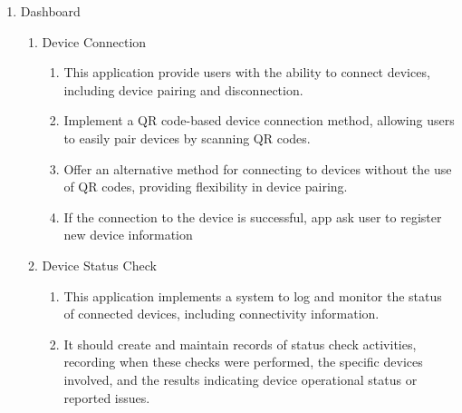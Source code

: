 \begin{enumerate}[label=\arabic*.]
      \item {\large{Dashboard}}\\
            \begin{enumerate}[label*={\arabic*.}]
                  \item {\large{Device Connection}}\\
                        \begin{enumerate}[label*={\arabic*.},ref=\theenumi.\arabic*]
                              \setlength{\itemindent}{0.5cm}
                              \item This application provide users with the ability to connect devices, including device pairing and disconnection.\\
                              \item Implement a QR code-based device connection method, allowing users to easily pair devices by scanning QR codes.\\
                              \item Offer an alternative method for connecting to devices without the use of QR codes, providing flexibility in device pairing.\\
                              \item If the connection to the device is successful, app ask user to register new device information\\
                        \end{enumerate}

                  \item {\large{Device Status Check}}\\
                        \begin{enumerate}[label*={\arabic*.},ref=\theenumi.\arabic*]
                              \setlength{\itemindent}{0.5cm}
                              \item This application implements a system to log and monitor the status of connected devices, including connectivity information.\\
                              \item It should create and maintain records of status check activities, recording when these checks were performed, the specific devices involved, and the results indicating device operational status or reported issues.\\
                        \end{enumerate}


\end{enumerate}
\end{enumerate}

